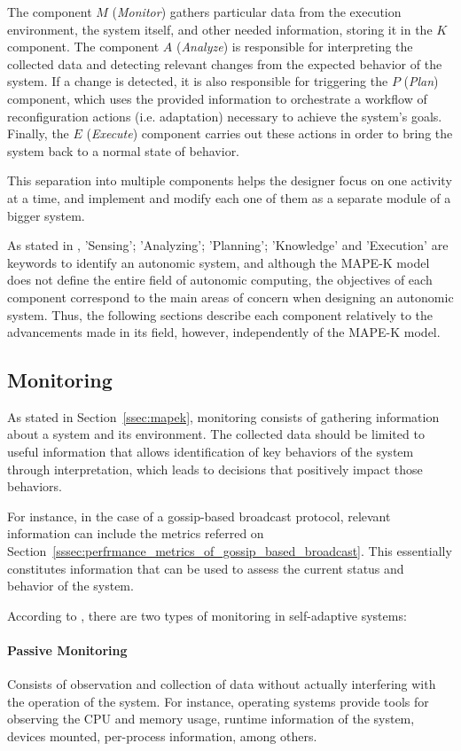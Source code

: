 The component $M$ (\textit{Monitor}) gathers particular data from the execution environment, the system itself, and other needed information, storing it in the $K$ component. The component $A$ (\textit{Analyze}) is responsible for interpreting the collected data and detecting relevant changes from the expected behavior of the system. If a change is detected, it is also responsible for triggering the $P$ (\textit{Plan}) component, which uses the provided information to orchestrate a workflow of reconfiguration actions (i.e. adaptation) necessary to achieve the system's goals. Finally, the $E$ (\textit{Execute}) component carries out these actions in order to bring the system back to a normal state of behavior.

This separation into multiple components helps the designer focus on one activity at a time, and implement and modify each one of them as a separate module of a bigger system.

As stated in \cite{Parashar2005}, 'Sensing'; 'Analyzing'; 'Planning'; 'Knowledge' and 'Execution' are keywords to identify an autonomic system, and although the MAPE-K model does not define the entire field of autonomic computing, the objectives of each component correspond to the main areas of concern when designing an autonomic system. Thus, the following sections describe each component relatively to the advancements made in its field, however, independently of the MAPE-K model.

\subsection{Monitoring}
\label{ssec:monitoring}
As stated in Section~\ref{ssec:mapek}, monitoring consists of gathering information about a system and its environment. The collected data should be limited to useful information that allows identification of key behaviors of the system through interpretation, which leads to decisions that positively impact those behaviors.

For instance, in the case of a gossip-based broadcast protocol, relevant information can include the metrics referred on Section~\ref{sssec:perfrmance_metrics_of_gossip_based_broadcast}. This essentially constitutes information that can be used to assess the current status and behavior of the system. 

According to \cite{Huebscher2008}, there are two types of monitoring in self-adaptive systems:

\paragraph{Passive Monitoring} \label{par:passivemonitoring} Consists of observation and collection of data without actually interfering with the operation of the system. For instance, operating systems provide tools for observing the CPU and memory usage, runtime information of the system, devices mounted, per-process information, among others.
